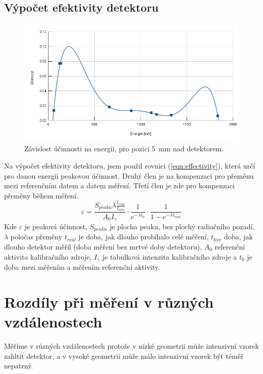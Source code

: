 \documentclass[12pt,a4paper]{article}
\begin{document}
\begin{spacing}{1.5}
\subsection{Výpočet efektivity detektoru}
\begin{figure}[h!]
	\renewcommand\figurename{Graf}
	\centering
	\includegraphics[width=0.7\linewidth]{google1.png}%
	\caption{Závislost účinnosti na energii, pro pozici \SI{5}{\milli\metre} nad detektorem.}
	\label{fig:EFFvsENG5mm}
\end{figure}
Na výpočet efektivity detektoru, jsem použil rovnici  (\ref{eqn:effectivity}), která určí pro danou energii peakovou účinnost.
 Druhý člen je na kompenzaci pro přeměnu mezi referenčním datem a datem měření. Třetí člen je zde pro kompenzaci přeměny během měření. %
\begin{equation}
	\label{eqn:effectivity}
	\varepsilon = \frac{S_{peaku}\lambda\frac{t_{real}}{t_{live}}}{A_0 I_\gamma}\cdot\frac{1}{e^{-\lambda t_0}}\cdot\frac{1}{1-e^{-\lambda t_{real}}}
\end{equation}
Kde $\varepsilon$ je peaková účinnost, $S_{peaku}$ je plocha peaku, bez plochy radiačního pozadí, $\lambda$ poločas přeměny  $t_{real}$ je doba, jak dlouho probíhalo celé měření, $t_{live}$ doba, jak dlouho detektor měřil (doba měření bez mrtvé doby detektoru), $A_0$ referenční aktivita kalibračního zdroje,  $I_\gamma$ je tabulková intenzita kalibračního zdroje a $t_0$ je doba mezi měřením a měřením referenční aktivity.
\section{Rozdíly při měření v různých vzdálenostech}
Měříme v různých vzdálenostech protože v nízké geometrii může intenzivní vzorek zahltit detektor, a v vysoké geometrii může málo intenzivní vzorek být téměř nepatrný. 

\end{spacing}
\end{document}
